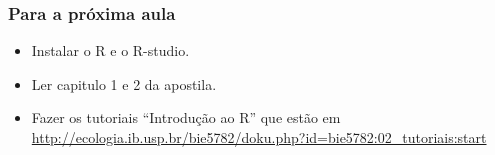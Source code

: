 \documentclass{beamer}
\begin{document}
\begin{frame}
  \frametitle{Para a próxima aula}
  \begin{itemize}
  \item Instalar o R e o R-studio.
  \item Ler capitulo 1 e 2 da apostila.
  \item  Fazer os tutoriais ``Introdução ao R'' que estão em \url{http://ecologia.ib.usp.br/bie5782/doku.php?id=bie5782:02_tutoriais:start}
  \end{itemize}
  
\end{frame}
\end{document}

